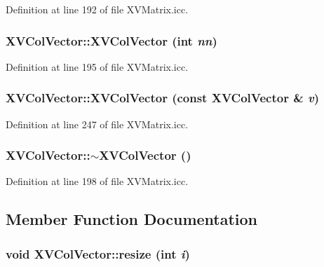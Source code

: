 Definition at line 192 of file XVMatrix.icc.\label{XVColVector_a1}
\hypertarget{class_XVColVector_a1}{
\subsubsection[XVColVector]{\setlength{\rightskip}{0pt plus 5cm}XVCol\-Vector::XVCol\-Vector (int {\em nn})}}




Definition at line 195 of file XVMatrix.icc.\label{XVColVector_a2}
\hypertarget{class_XVColVector_a2}{
\subsubsection[XVColVector]{\setlength{\rightskip}{0pt plus 5cm}XVCol\-Vector::XVCol\-Vector (const XVCol\-Vector \& {\em v})}}




Definition at line 247 of file XVMatrix.icc.\label{XVColVector_a3}
\hypertarget{class_XVColVector_a3}{
\subsubsection[~XVColVector]{\setlength{\rightskip}{0pt plus 5cm}XVCol\-Vector::$\sim$XVCol\-Vector ()}}




Definition at line 198 of file XVMatrix.icc.

\subsection{Member Function Documentation}
\label{XVColVector_a4}
\hypertarget{class_XVColVector_a4}{
\subsubsection[resize]{\setlength{\rightskip}{0pt plus 5cm}void XVCol\-Vector::resize (int {\em i})}}




